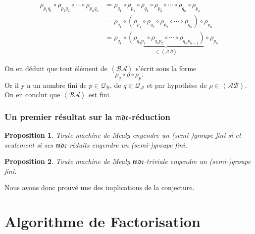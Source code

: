 \documentclass[11pt]{beamer}
\newtheorem{prop}{Proposition}
\begin{document}
\begin{frame}
  \begin{align*}
    \rho_{p_1q_1}\circ\rho_{p_2q_2}\circ\cdots\circ\rho_{p_nq_n} &= \rho_{q_1}\circ\rho_{p_1}\circ\rho_{q_2}\circ\rho_{p_2}\circ\cdots\circ\rho_{q_n}\circ\rho_{p_n} \\
    &=\rho_{q_1}\circ\left(\rho_{p_1}\circ\rho_{q_2}\circ\rho_{p_2}\circ\cdots\circ\rho_{q_n}\right)\circ\rho_{p_n} \\
    &=\rho_{q_1}\circ\underbrace{\left(\rho_{q_2p_1}\circ\rho_{q_3p_2}\circ\cdots\circ\rho_{q_np_{n-1}}\right)}_{\in\left<\mathcal{A}\mathcal{B}\right>}\circ\rho_{p_n}
  \end{align*}

  On en déduit que tout élément de $\left<\mathcal{B}\mathcal{A}\right>$ s'écrit sous la forme
  \[ \rho_q\circ\rho\circ\rho_p. \] Or il y a un nombre fini de $p\in\mathcal{Q}_\mathcal{B}$, de $q\in\mathcal{Q}_\mathcal{A}$ et par hypothèse de $\rho\in\left<\mathcal{AB}\right>$. On en conclut que $\left<\mathcal{BA}\right>$ est fini.

\end{frame}

\begin{frame}
  \frametitle{Un premier résultat sur la $\mathfrak{mdc}$-réduction}
  \begin{prop}
    Toute machine de Mealy engendre un (semi-)groupe fini si et seulement si ses $\mathfrak{mdc}$-réduits engendre un (semi-)groupe fini.
  \end{prop}

  \begin{prop}
    Toute machine de Mealy $\mathfrak{mdc}$-triviale engendre un (semi-)groupe fini.
  \end{prop}

  Nous avons donc prouvé une des implications de la conjecture.
\end{frame}

\section{Algorithme de Factorisation}
\end{document}

